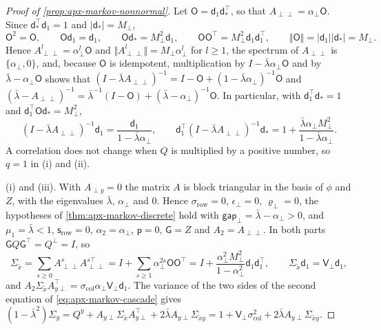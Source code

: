\begin{proof}[Proof of \cref{prop:apx-markov-nonnormal}]
Let $\mathsf O=\mathsf d_1\mathsf d_\ast^\top$, so that $A_{\perp\perp}=\alpha_\perp\mathsf O$. Since $\mathsf d_\ast^\top\mathsf d_1=1$ and $\lvert\mathsf d_\ast\rvert=M_\perp$,
\begin{equation*}
\mathsf O^2=\mathsf O,\qquad\mathsf O\mathsf d_1=\mathsf d_1,\qquad\mathsf O\mathsf d_\ast=M_\perp^2\mathsf d_1,\qquad\mathsf O\mathsf O^\top=M_\perp^2\mathsf d_1\mathsf d_1^\top,\qquad\Vert\mathsf O\Vert=\lvert\mathsf d_1\rvert\lvert\mathsf d_\ast\rvert=M_\perp .
\end{equation*}
Hence $A_{\perp\perp}^l=\alpha_\perp^l\mathsf O$ and $\Vert A_{\perp\perp}^l\Vert=M_\perp\alpha_\perp^l$ for $l\ge1$, the spectrum of $A_{\perp\perp}$ is $\{\alpha_\perp,0\}$, and, because $\mathsf O$ is idempotent, multiplication by $I-\bar\lambda\alpha_\perp\mathsf O$ and by $\bar\lambda-\alpha_\perp\mathsf O$ shows that $(I-\bar\lambda A_{\perp\perp})^{-1}=I-\mathsf O+(1-\bar\lambda\alpha_\perp)^{-1}\mathsf O$ and $(\bar\lambda-A_{\perp\perp})^{-1}=\bar\lambda^{-1}(I-\mathsf O)+(\bar\lambda-\alpha_\perp)^{-1}\mathsf O$. In particular, with $\mathsf d_1^\top\mathsf d_\ast=1$ and $\mathsf d_1^\top\mathsf O\mathsf d_\ast=M_\perp^2$,
\begin{equation}\label{eq:apx-markov-oblique}
(I-\bar\lambda A_{\perp\perp})^{-1}\mathsf d_1=\frac{\mathsf d_1}{1-\bar\lambda\alpha_\perp},\qquad\mathsf d_1^\top(I-\bar\lambda A_{\perp\perp})^{-1}\mathsf d_\ast=1+\frac{\bar\lambda\alpha_\perp M_\perp^2}{1-\bar\lambda\alpha_\perp} .
\end{equation}
A correlation does not change when $Q$ is multiplied by a positive number, so $q=1$ in (i) and (ii).

(i) and (iii). With $A_{\perp y}=0$ the matrix $A$ is block triangular in the basis of $\phi$ and $Z$, with the eigenvalues $\bar\lambda$, $\alpha_\perp$ and $0$. Hence $\sigma_{\mathrm{row}}=0$, $\epsilon_\perp=0$, $\varrho_\perp=0$, the hypotheses of \cref{thm:apx-markov-discrete} hold with $\mathsf{gap}_\perp=\bar\lambda-\alpha_\perp>0$, and $\mu_1=\bar\lambda<1$, $\mathsf s_{\mathrm{row}}=0$, $\alpha_2=\alpha_\perp$, $\mathsf p=0$, $\mathsf G=Z$ and $A_2=A_{\perp\perp}$. In both parts $\mathsf GQ\mathsf G^\top=Q^\perp=I$, so
\begin{equation*}
\Sigma_{\tilde x}=\sum_{s\ge0}A_{\perp\perp}^sA_{\perp\perp}^{s\top}=I+\sum_{s\ge1}\alpha_\perp^{2s}\mathsf O\mathsf O^\top=I+\frac{\alpha_\perp^2M_\perp^2}{1-\alpha_\perp^2}\mathsf d_1\mathsf d_1^\top,\qquad\Sigma_{\tilde x}\mathsf d_1=\mathsf V_\perp\mathsf d_1,
\end{equation*}
and $A_2\Sigma_{\tilde x}A_{y\perp}^\top=\sigma_{\mathrm{col}}\alpha_\perp\mathsf V_\perp\mathsf d_1$. The variance of the two sides of the second equation of \eqref{eq:apx-markov-cascade} gives $(1-\bar\lambda^2)\Sigma_y=Q^y+A_{y\perp}\Sigma_{\tilde x}A_{y\perp}^\top+2\bar\lambda A_{y\perp}\Sigma_{\tilde xy}=1+\mathsf V_\perp\sigma_{\mathrm{col}}^2+2\bar\lambda A_{y\perp}\Sigma_{\tilde xy}$.


\end{proof}

